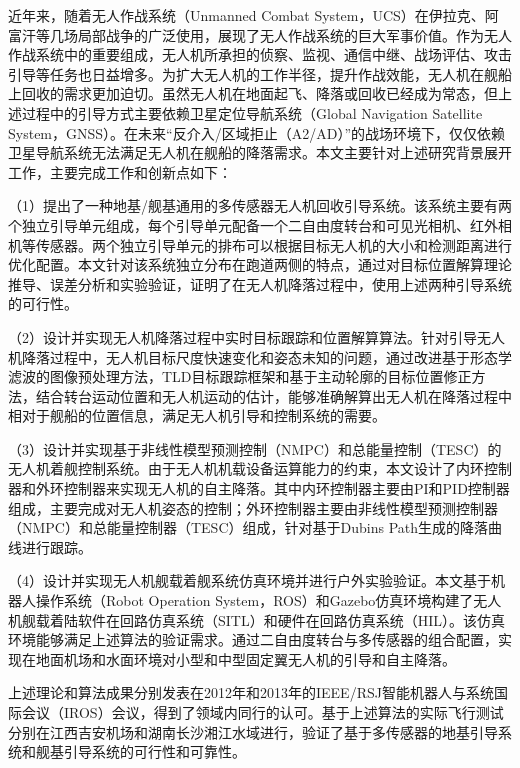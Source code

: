 \begin{cabstract}
近年来，随着无人作战系统（Unmanned Combat System，UCS）在伊拉克、阿富汗等几场局部战争的广泛使用，展现了无人作战系统的巨大军事价值。作为无人作战系统中的重要组成，无人机所承担的侦察、监视、通信中继、战场评估、攻击引导等任务也日益增多。为扩大无人机的工作半径，提升作战效能，无人机在舰船上回收的需求更加迫切。虽然无人机在地面起飞、降落或回收已经成为常态，但上述过程中的引导方式主要依赖卫星定位导航系统（Global Navigation Satellite System，GNSS）。在未来“反介入/区域拒止（A2/AD）”的战场环境下，仅仅依赖卫星导航系统无法满足无人机在舰船的降落需求。本文主要针对上述研究背景展开工作，主要完成工作和创新点如下：

（1）提出了一种地基/舰基通用的多传感器无人机回收引导系统。该系统主要有两个独立引导单元组成，每个引导单元配备一个二自由度转台和可见光相机、红外相机等传感器。两个独立引导单元的排布可以根据目标无人机的大小和检测距离进行优化配置。本文针对该系统独立分布在跑道两侧的特点，通过对目标位置解算理论推导、误差分析和实验验证，证明了在无人机降落过程中，使用上述两种引导系统的可行性。

（2）设计并实现无人机降落过程中实时目标跟踪和位置解算算法。针对引导无人机降落过程中，无人机目标尺度快速变化和姿态未知的问题，通过改进基于形态学滤波的图像预处理方法，TLD目标跟踪框架和基于主动轮廓的目标位置修正方法，结合转台运动位置和无人机运动的估计，能够准确解算出无人机在降落过程中相对于舰船的位置信息，满足无人机引导和控制系统的需要。

（3）设计并实现基于非线性模型预测控制（NMPC）和总能量控制（TESC）的无人机着舰控制系统。由于无人机机载设备运算能力的约束，本文设计了内环控制器和外环控制器来实现无人机的自主降落。其中内环控制器主要由PI和PID控制器组成，主要完成对无人机姿态的控制；外环控制器主要由非线性模型预测控制器（NMPC）和总能量控制器（TESC）组成，针对基于Dubins Path生成的降落曲线进行跟踪。

（4）设计并实现无人机舰载着舰系统仿真环境并进行户外实验验证。本文基于机器人操作系统（Robot Operation System，ROS）和Gazebo仿真环境构建了无人机舰载着陆软件在回路仿真系统（SITL）和硬件在回路仿真系统（HIL）。该仿真环境能够满足上述算法的验证需求。通过二自由度转台与多传感器的组合配置，实现在地面机场和水面环境对小型和中型固定翼无人机的引导和自主降落。

上述理论和算法成果分别发表在2012年和2013年的IEEE/RSJ智能机器人与系统国际会议（IROS）会议，得到了领域内同行的认可。基于上述算法的实际飞行测试分别在江西吉安机场和湖南长沙湘江水域进行，验证了基于多传感器的地基引导系统和舰基引导系统的可行性和可靠性。

\end{cabstract}

